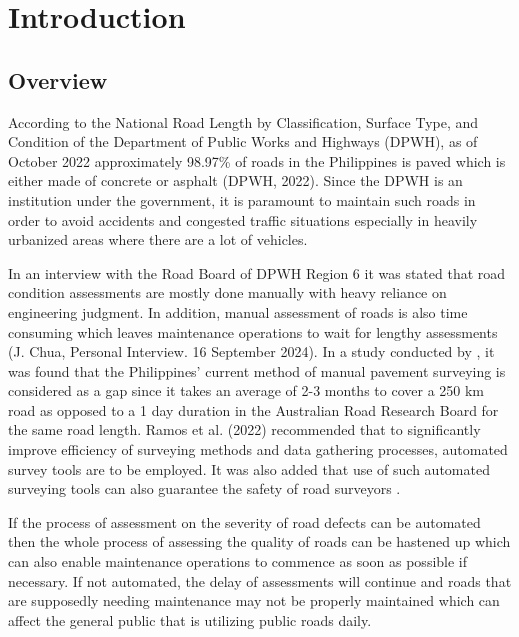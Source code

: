 \chapter{Introduction}
\label{sec:researchdesc}    %

\section{Overview}
\label{sec:overview}

According to the National Road Length by Classification, Surface Type, and Condition of the Department of Public Works and Highways (DPWH), as of October 2022 approximately 98.97\% of roads in the Philippines is paved which is either made of concrete or asphalt (DPWH, 2022). Since the DPWH is an institution under the government, it is paramount to maintain such roads in order to avoid accidents and congested traffic situations especially in heavily urbanized areas where there are a lot of vehicles.


In an interview with the Road Board of DPWH Region 6 it was stated that road condition assessments are mostly done manually with heavy reliance on engineering judgment. In addition, manual assessment of roads is also time consuming which leaves maintenance operations to wait for lengthy assessments (J. Chua, Personal Interview. 16 September 2024).  In a study conducted by \cite{ramos2023}, it was found that the Philippines’ current method of manual pavement surveying is considered as a gap since it takes an average of 2-3 months to cover a 250 km road as opposed to a 1 day duration in the Australian Road Research Board for the same road length. Ramos et al. (2022) recommended that to significantly improve efficiency of surveying methods and data gathering processes, automated survey tools are to be employed. It was also added that use of such automated surveying tools can also guarantee the safety of road surveyors \cite{ramos2023}.


If the process of assessment on the severity of road defects can be automated then the whole process of assessing the quality of roads can be hastened up which can also enable maintenance operations to commence as soon as possible if necessary. If not automated, the delay of assessments will continue and roads that are supposedly needing maintenance may not be properly maintained which can affect the general public that is utilizing public roads daily.

